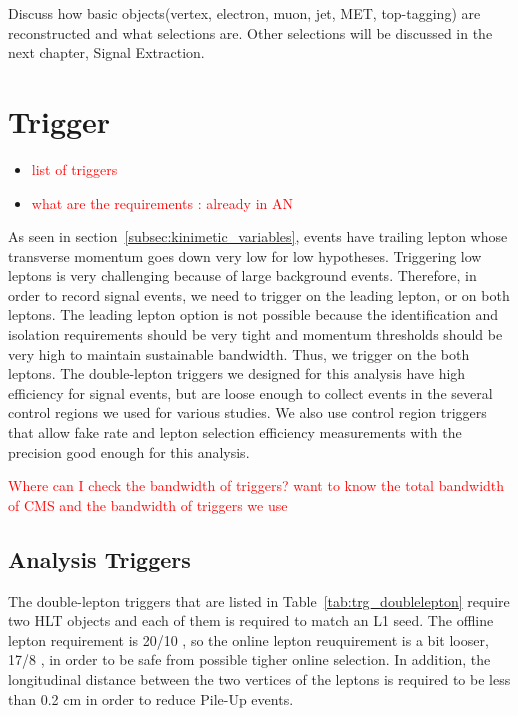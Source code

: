 Discuss how basic objects(vertex, electron, muon, jet, MET, top-tagging) 
are reconstructed and what selections are.
Other selections will be discussed in the next chapter, Signal Extraction.

\section{Trigger}
\label{sec:trigger}
\begin{itemize} 
\item \textcolor{red}{list of triggers} 
\item \textcolor{red}{what are the requirements : already in AN }
\end{itemize} 

As seen in section~\ref{subsec:kinimetic_variables}, \hww{} events have trailing lepton 
whose transverse momentum goes down very low for low \mHi{} hypotheses. Triggering low 
\pt{} leptons is very challenging because of large background events. 
Therefore, in order to record signal events, we need to trigger on the leading lepton, 
or on both leptons. The leading lepton option is not possible because the identification 
and isolation requirements should be very tight and momentum thresholds should be very 
high to maintain sustainable bandwidth. Thus, we trigger on the both leptons. 
The double-lepton triggers we designed for this analysis have high efficiency for  
signal events, but are loose enough to collect events in the several control regions 
we used for various studies. We also use control region triggers that allow 
fake rate and lepton selection efficiency measurements with the precision
good enough for this analysis. 

\textcolor{red}{Where can I check the bandwidth of triggers? want to know 
the total bandwidth of CMS and the bandwidth of triggers we use}

\subsection{Analysis Triggers}

The double-lepton triggers that are listed in Table~\ref{tab:trg_doublelepton} require 
two HLT objects and each of them is required to match an L1 seed. The offline lepton \pt{} 
requirement is 20/10 \GeV, so the online lepton \pt{} reuquirement is a bit looser, 17/8 \GeV, 
in order to be safe from possible tigher online selection. In addition,
the longitudinal distance between the two vertices of the leptons is required 
to be less than 0.2 cm in order to reduce Pile-Up events. 

